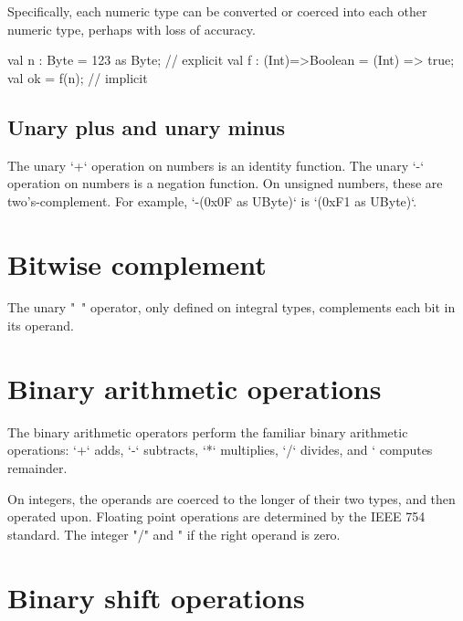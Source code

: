 Specifically, each numeric type can be converted or coerced into each other
numeric type, perhaps with loss of accuracy.
\begin{ex}
\begin{xten}
val n : Byte = 123 as Byte; // explicit 
val f : (Int)=>Boolean = (Int) => true; 
val ok = f(n); // implicit
\end{xten}
\end{ex}


\subsection{Unary plus and unary minus}

The unary \xcd`+` operation on numbers is an identity function.
The unary \xcd`-` operation on numbers is a negation function.
On unsigned numbers, these are two's-complement.  For example, 
\xcd`-(0x0F as UByte)` is 
\xcd`(0xF1 as UByte)`.



\section{Bitwise complement}

The unary \xcd"~" operator, only defined on integral types, complements each
bit in its operand.  

\section{Binary arithmetic operations} 

The binary arithmetic operators perform the familiar binary arithmetic
operations: \xcd`+` adds, \xcd`-` subtracts, \xcd`*` multiplies, 
\xcd`/` divides, and \xcd`%
computes remainder.

On integers, the operands are coerced to the longer of their two types, and
then operated upon.  
Floating point operations are determined by the IEEE 754
standard. 
The integer \xcd"/" and \xcd"%
if the right operand is zero.



\section{Binary shift operations}

